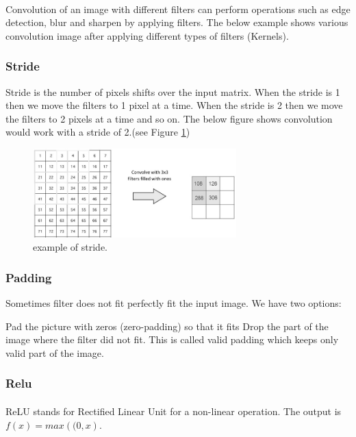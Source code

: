 \paragraph{}
Convolution of an image with different filters can perform operations such as edge detection, blur and sharpen by applying filters. The below example shows various convolution image after applying different types of filters (Kernels).
\subsubsection{Stride}
Stride is the number of pixels shifts over the input matrix. When the stride is 1 then we move the filters to 1 pixel at a time. When the stride is 2 then we move the filters to 2 pixels at a time and so on. The below figure shows convolution would work with a stride of 2.(see Figure \ref{stride})
\begin{figure}[H]
	\centering
	\includegraphics[width=0.7\textwidth]{stride.jpg}
	\caption{example of stride.}
	\label{stride}
\end{figure}
\subsubsection{Padding}
Sometimes filter does not fit perfectly fit the input image. We have two options:

Pad the picture with zeros (zero-padding) so that it fits Drop the part of the image where the filter did not fit. This is called valid padding which keeps only valid part of the image.
\subsubsection{Relu}
\paragraph{}
ReLU stands for Rectified Linear Unit for a non-linear operation. The output is $f\left(x\right) = max\left( (0,x\right)$.
